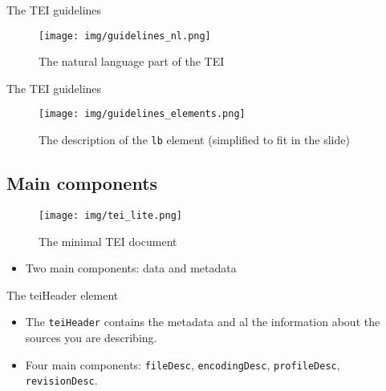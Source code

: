 \documentclass[11pt,aspectratio=1610]{beamer}
\begin{document}
\begin{frame}{The TEI guidelines}
\begin{center}
\begin{figure}
\texttt{[image: img/guidelines\_nl.png]}
\caption{The natural language part of the TEI}
\end{figure}
\end{center}
\end{frame}


\begin{frame}{The TEI guidelines}
\begin{center}
\begin{figure}
\texttt{[image: img/guidelines\_elements.png]}
\caption{The description of the \texttt{lb} element (simplified to fit in the slide)}
\end{figure}
\end{center}
\end{frame}


\subsection{Main components}
\begin{frame}
\begin{center}
\begin{figure}
\texttt{[image: img/tei\_lite.png]}
\caption{The minimal TEI document}
\end{figure}
\end{center}
\end{frame}


\begin{frame}
\begin{itemize}
\item Two main components: data and metadata 
\end{itemize}
\end{frame}


\begin{frame}{The teiHeader element}
\begin{itemize}
\item The \texttt{teiHeader} contains the metadata and al the information about the sources you are describing.
\item Four main components: \texttt{fileDesc}, \texttt{encodingDesc}, \texttt{profileDesc}, \texttt{revisionDesc}. 
\end{itemize}
\end{frame}
\end{document}
